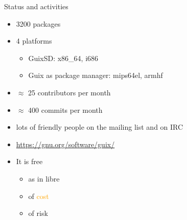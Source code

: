 \documentclass [t]{beamer}
\begin{document}
\begin {frame}{Status and activities}
\begin {itemize}
\item
3200 packages
\item
4 platforms
\begin {itemize}
\item
GuixSD: x86\_64, i686
\item
Guix as package manager: mips64el, armhf
\end {itemize}
\item
$\approx$ 25 contributors per month
\item
$\approx$ 400 commits per month
\item
lots of friendly people on the mailing list and on IRC
\end {itemize}

\pause
\vfill
\begin {center}
\color {rot}\framebox {\textcolor {orange}{Try it out!}}
\end {center}
\begin {itemize}
\item
\url {https://gnu.org/software/guix/}
\item
It is free
\begin {itemize}
\item
as in \textcolor {gruen}{libre}
\item
of \textcolor {orange}{cost}
\item
of \textcolor {rot}{risk}
\end {itemize}
\end {itemize}
\end {frame}
\end{document}
